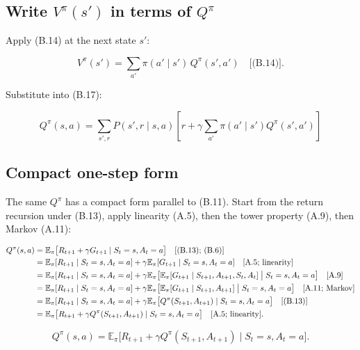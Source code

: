 \subsection{Write $V^\pi(s')$ in terms of $Q^\pi$}

Apply (B.14) at the next state $s'$:

\[
V^\pi(s')
=
\sum_{a'}
\pi(a'\mid s')\, Q^\pi(s',a')
\quad\text{[(B.14)]}.
\]

Substitute into (B.17):

\begin{equation}
\boxed{
Q^\pi(s,a)
=
\sum_{s',r}
P(s',r\mid s,a)
\left[
r+
\gamma
\sum_{a'}
\pi(a'\mid s')Q^\pi(s',a')
\right]
}
\tag{B.2}
\end{equation}

\subsection{Compact one-step form}

The same $Q^\pi$ has a compact form parallel to (B.11). Start from the return recursion under (B.13), apply linearity (A.5), then the tower property (A.9), then Markov (A.11):

\[
\begin{aligned}
Q^\pi(s,a)
&=
\mathbb{E}_\pi\bigl[R_{t+1}+\gamma G_{t+1}\mid S_t=s,A_t=a\bigr]
\quad\text{[(B.13); (B.6)]}
\\
&=
\mathbb{E}_\pi[R_{t+1}\mid S_t=s,A_t=a]
+
\gamma
\mathbb{E}_\pi[G_{t+1}\mid S_t=s,A_t=a]
\quad\text{[A.5; linearity]}
\\
&=
\mathbb{E}_\pi[R_{t+1}\mid S_t=s,A_t=a]
+
\gamma
\mathbb{E}_\pi\bigl[
\mathbb{E}_\pi[G_{t+1}\mid S_{t+1},A_{t+1},S_t,A_t]
\bigm|
S_t=s,A_t=a
\bigr]
\quad\text{[A.9]}
\\
&=
\mathbb{E}_\pi[R_{t+1}\mid S_t=s,A_t=a]
+
\gamma
\mathbb{E}_\pi\bigl[
\mathbb{E}_\pi[G_{t+1}\mid S_{t+1},A_{t+1}]
\bigm|
S_t=s,A_t=a
\bigr]
\quad\text{[A.11; Markov]}
\\
&=
\mathbb{E}_\pi[R_{t+1}\mid S_t=s,A_t=a]
+
\gamma
\mathbb{E}_\pi\bigl[Q^\pi(S_{t+1},A_{t+1})\mid S_t=s,A_t=a\bigr]
\quad\text{[(B.13)]}
\\
&=
\mathbb{E}_\pi\bigl[R_{t+1}+\gamma Q^\pi(S_{t+1},A_{t+1})\mid S_t=s,A_t=a\bigr]
\quad\text{[A.5; linearity]}.
\end{aligned}
\]

\begin{equation}
\boxed{
Q^\pi(s,a)
=
\mathbb{E}_\pi\bigl[R_{t+1}+\gamma Q^\pi(S_{t+1},A_{t+1})\mid S_t=s,A_t=a\bigr].
}
\tag{B.18}\label{eq:B.18}
\end{equation}

